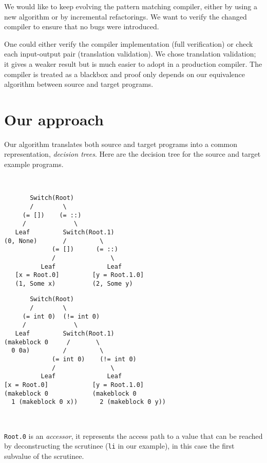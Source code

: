 \documentclass[12pt]{article}
\begin{document}
We would like to keep evolving the pattern matching compiler, either by
using a new algorithm or by incremental refactorings.
We want to verify the changed compiler to ensure that no bugs were
introduced.

One could either verify the compiler implementation
(full verification) or check each input-output pair
(translation validation). We chose translation validation; it gives
a weaker result but is much easier to adopt in a production
compiler. The compiler is treated as a blackbox and proof only depends
on our equivalence algorithm between source and target programs.

\section{Our approach}

Our algorithm translates both source and target programs into a common
representation, \emph{decision trees}. Here are the decision tree for the
source and target example programs.

~

\hspace{-2em}
\begin{minipage}{0.5\linewidth}
\begin{verbatim}
       Switch(Root)
       /        \
     (= [])    (= ::)
     /             \
   Leaf         Switch(Root.1)
(0, None)       /         \
             (= [])      (= ::)
             /               \
          Leaf              Leaf
   [x = Root.0]         [y = Root.1.0]
   (1, Some x)          (2, Some y)
\end{verbatim}
\end{minipage}
\hfill
\begin{minipage}{0.5\linewidth}
\begin{verbatim}
       Switch(Root)
       /        \
     (= int 0)  (!= int 0)
     /             \
   Leaf         Switch(Root.1)
(makeblock 0     /       \
  0 0a)         /         \
             (= int 0)    (!= int 0)
             /               \
          Leaf              Leaf
[x = Root.0]            [y = Root.1.0]
(makeblock 0            (makeblock 0
  1 (makeblock 0 x))      2 (makeblock 0 y))
\end{verbatim}
\end{minipage}

~

\texttt{Root.0} is an \emph{accessor}, it represents the
access path to a value that can be reached by deconstructing the
scrutinee (\texttt{li} in our example), in this case the first
subvalue of the scrutinee.
\end{document}
